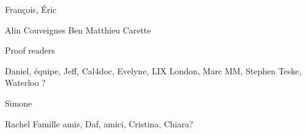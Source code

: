 François, Éric

Alin
Couveignes
Ben
Matthieu
Carette

Proof readers

Daniel, équipe, Jeff, 
Cal4doc, 
Evelyne, LIX
London, Marc MM, Stephen
Teske, Waterloo ?

Simone

Rachel
Famille
amis, Daf,
amici, Cristina, Chiara?



